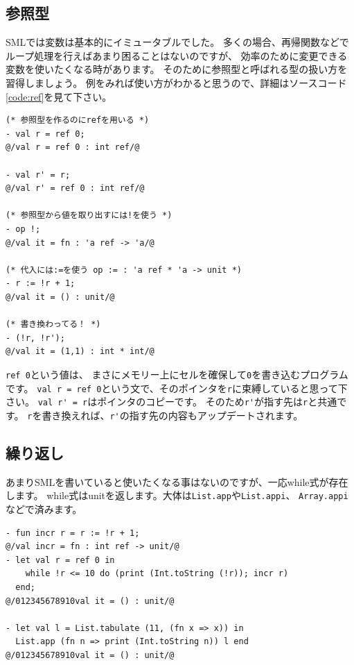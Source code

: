 \documentclass[11pt,a4paper]{article}
\begin{document}
\subsection{参照型}

SMLでは変数は基本的にイミュータブルでした。
多くの場合、再帰関数などでループ処理を行えばあまり困ることはないのですが、
効率のために変更できる変数を使いたくなる時があります。
そのために参照型と呼ばれる型の扱い方を習得しましょう。
例をみれば使い方がわかると思うので、詳細はソースコード\ref{code:ref}を見て下さい。

\begin{lstlisting}[caption=ref型,label=code:ref]
(* 参照型を作るのにrefを用いる *)
- val r = ref 0;
@/val r = ref 0 : int ref/@

- val r' = r;
@/val r' = ref 0 : int ref/@

(* 参照型から値を取り出すには!を使う *)
- op !;
@/val it = fn : 'a ref -> 'a/@

(* 代入には:=を使う op := : 'a ref * 'a -> unit *)
- r := !r + 1;
@/val it = () : unit/@

(* 書き換わってる！ *)
- (!r, !r');
@/val it = (1,1) : int * int/@
\end{lstlisting}

\lstinline{ref 0}という値は、
まさにメモリー上にセルを確保して\lstinline{0}を書き込むプログラムです。
\lstinline{val r = ref 0}という文で、そのポインタを\lstinline{r}に束縛していると思って下さい。
\lstinline{val r' = r}はポインタのコピーです。
そのため\lstinline{r'}が指す先は\lstinline{r}と共通です。
\lstinline{r}を書き換えれば、\lstinline{r'}の指す先の内容もアップデートされます。

\subsection{繰り返し}

あまりSMLを書いていると使いたくなる事はないのですが、一応while式が存在します。
while式はunitを返します。大体は\lstinline{List.app}や\lstinline{List.appi}、
\lstinline{Array.appi}などで済みます。

\begin{lstlisting}[caption=while式,label=code:while]
- fun incr r = r := !r + 1;
@/val incr = fn : int ref -> unit/@
- let val r = ref 0 in
    while !r <= 10 do (print (Int.toString (!r)); incr r)
  end;
@/012345678910val it = () : unit/@

- let val l = List.tabulate (11, (fn x => x)) in
  List.app (fn n => print (Int.toString n)) l end
@/012345678910val it = () : unit/@
\end{lstlisting}
\end{document}
